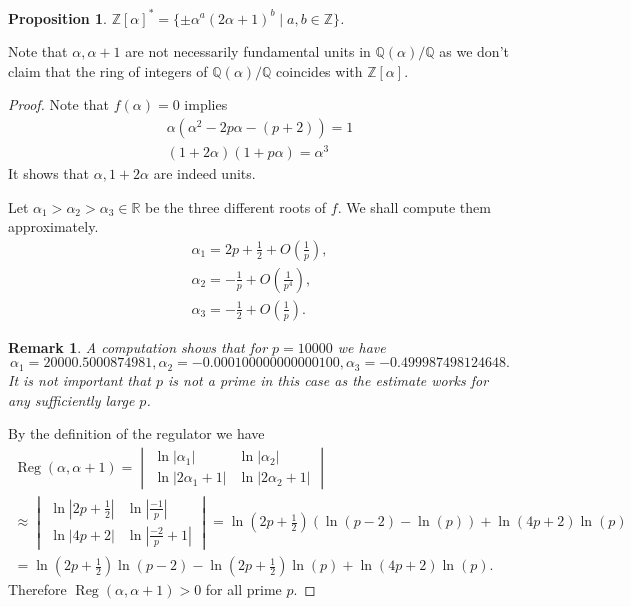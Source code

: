 \documentclass[a4paper]{article}
\newtheorem{Prop}[Thm]{Proposition}
\newtheorem{Rem}[Thm]{Remark}
\newcommand{\R}{\mathbb{R}}        %
\newcommand{\Q}{\mathbb{Q}}        %
\DeclareMathOperator{\Reg}{Reg}        %
\begin{document}
\begin{Prop}
	\label{prop_multiplicative_group_structure}
$\mathbb{Z}[\alpha]^{*} = \{ \pm \alpha^a (2\alpha + 1)^b \mid a, b \in \mathbb{Z} \} $.
\end{Prop}
Note that $\alpha, \alpha + 1$ are not necessarily fundamental units in $\Q(\alpha)/\Q$ as we don't claim that the ring of integers of $\Q(\alpha) / \Q$ coincides with $\mathbb{Z}[\alpha]$.
\begin{proof}
Note that $f(\alpha) = 0$ implies 
\begin{gather}
\alpha (\alpha^2 - 2p \alpha - (p + 2)) = 1
\\
\label{equation_units}
(1 + 2 \alpha) (1 + p \alpha) = \alpha^3
\end{gather}
It shows that $\alpha, 1 + 2 \alpha$ are indeed units.

Let $\alpha_1 > \alpha_2 > \alpha_3 \in \R$ be the three different roots of $f$.
We shall compute them approximately.
\begin{gather*}
\alpha_1 = 2 p + \frac{1}{2} + O\left(\frac{1}{p}\right), \\
\alpha_2 = - \frac{1}{ p } + O\left(\frac{1}{p^4}\right), \\
\alpha_3 = - \frac{1}{2} + O\left(\frac{1}{p}\right)
.\end{gather*}
\begin{Rem}




A computation shows that for $p = 10000$
we have
 \[
\alpha_1 = 20000.5000874981 ,
\alpha_2 = -0.000100000000000100 ,
\alpha_3 = -0.499987498124648 
.\] 
It is not important that $p$ is not a prime in this case as the estimate works for any sufficiently large $p$.
\end{Rem}

By the definition of the regulator we have
\begin{multline}
\Reg(\alpha, \alpha + 1) = 
\begin{vmatrix}
\ln |\alpha_1| 		& \ln |\alpha_2| \\
\ln |2 \alpha_1 + 1| 	& \ln |2 \alpha_2 + 1|
\end{vmatrix} 
\\
\approx
\begin{vmatrix}
\ln |2p + \frac{1}{2}| 	& \ln |\frac{-1}{p}| \\
\ln |4 p + 2| 	& \ln |\frac{-2}{p} + 1|
\end{vmatrix}
=
\ln(2p + \frac{1}{2})
(\ln(p - 2) - \ln(p))
+
\ln(4p + 2) \ln(p)
\\
=
\ln(2 p + \frac{1}{2}) \ln(p - 2) - \ln(2 p + \frac{1}{2}) \ln(p) + \ln(4p + 2) \ln(p)
.\end{multline}
Therefore $ \Reg(\alpha, \alpha + 1) > 0 $ for all prime $p$.


\end{proof}
\end{document}
